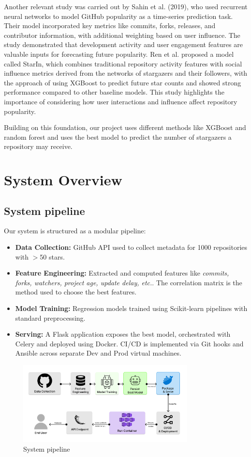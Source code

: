 \documentclass[12pt,a4paper]{article}
\begin{document}
Another relevant study was carried out by Sahin et al. (2019),\cite{4} who used recurrent neural networks to model GitHub popularity as a time-series prediction task. Their model incorporated key metrics like commits, forks, releases, and contributor information, with additional weighting based on user influence. The study demonstrated that development activity and user engagement features are valuable inputs for forecasting future popularity. Ren et al.\cite{2} proposed a model called StarIn, which combines traditional repository activity features with social influence metrics derived from the networks of stargazers and their followers, with the approach of using XGBoost to predict future star counts and showed strong performance compared to other baseline models. This study highlights the importance of considering how user interactions and influence affect repository popularity.

Building on this foundation, our project uses different methods like XGBoost and random forest and uses the best model to predict the number of stargazers a repository may receive. 

\section{System Overview}
\subsection{System pipeline}
Our system is structured as a modular pipeline:
\begin{itemize}
    \item \textbf{Data Collection:} GitHub API used to collect metadata for 1000 repositories with $>$50 stars.
    \item \textbf{Feature Engineering:} Extracted and computed features like \textit{commits, forks, watchers, project age, update delay, etc.}. The correlation matrix is the method used to choose the best features.
    \item \textbf{Model Training:} Regression models trained using Scikit-learn pipelines with standard preprocessing.
    \item \textbf{Serving:} A Flask application exposes the best model, orchestrated with Celery and deployed using Docker. CI/CD is implemented via Git hooks and Ansible across separate Dev and Prod virtual machines.
\end{itemize}
\begin{figure}[H]
  \centering
  \includegraphics[width=0.8\textwidth]{Architecture.png}
  \caption{System pipeline}
  \label{fig:my-image}
\end{figure}
\end{document}
